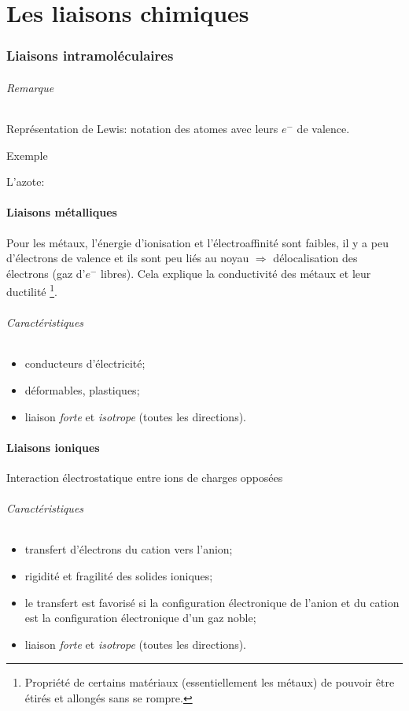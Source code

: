 \part{Les liaisons chimiques}
\section{Liaisons intramoléculaires}
\paragraph{Remarque} Représentation de Lewis: notation des atomes avec leurs $e^-$ de valence.

\subparagraph{Exemple} L'azote:\hspace{0.7cm} 

\subsection{Liaisons métalliques}
Pour les métaux,
l'énergie d'ionisation et l'électroaffinité sont faibles,
il y a peu d'électrons de valence et ils sont peu liés au noyau $\Rightarrow$
délocalisation des électrons (gaz d'$e^-$ libres).
Cela explique la conductivité des métaux et leur ductilité
\footnote{Propriété de certains matériaux (essentiellement les métaux)
de pouvoir être étirés et allongés sans se rompre.}.
\paragraph{Caractéristiques}
\begin{itemize}
  \item conducteurs d'électricité;
  \item déformables, plastiques;
  \item liaison \emph{forte} et \emph{isotrope} (toutes les directions).
\end{itemize}

\subsection{Liaisons ioniques}
Interaction électrostatique entre ions de charges opposées
\paragraph{Caractéristiques}
\begin{itemize}
  \item transfert d'électrons du cation vers l'anion;
  \item rigidité et fragilité des solides ioniques;
  \item le transfert est favorisé si la configuration électronique de l'anion
    et du cation est la configuration électronique d'un gaz noble;
  \item liaison \emph{forte} et \emph{isotrope} (toutes les directions).
\end{itemize}

